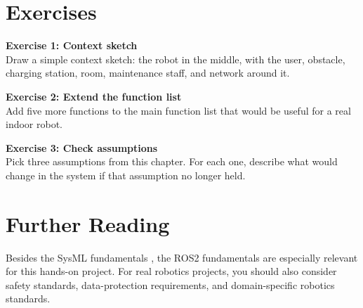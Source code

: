 \section{Exercises}
\begin{uebungbox}
\textbf{Exercise 1: Context sketch}\\
Draw a simple context sketch: the robot in the middle, with the user, obstacle, charging station, room, maintenance staff, and network around it.
\end{uebungbox}

\begin{uebungbox}
\textbf{Exercise 2: Extend the function list}\\
Add five more functions to the main function list that would be useful for a real indoor robot.
\end{uebungbox}

\begin{uebungbox}
\textbf{Exercise 3: Check assumptions}\\
Pick three assumptions from this chapter. For each one, describe what would change in the system if that assumption no longer held.
\end{uebungbox}

\section{Further Reading}
Besides the SysML fundamentals \cite{delligatti2014,friedenthal2014}, the ROS2 fundamentals \cite{ros2docs} are especially relevant for this hands-on project. For real robotics projects, you should also consider safety standards, data-protection requirements, and domain-specific robotics standards.
